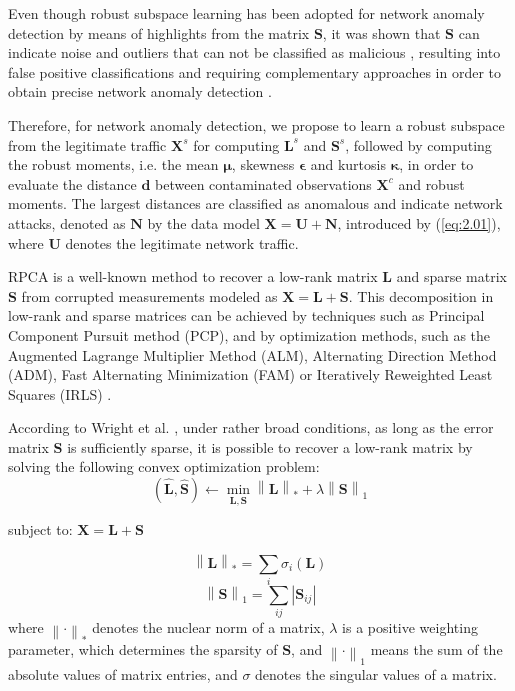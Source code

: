 Even though robust subspace learning has been adopted for network anomaly detection by means of highlights from the matrix $\pmb{S}$, it was shown that $\pmb{S}$ can indicate noise and outliers that can not be classified as malicious \cite{vaswani2018robust, lerman2018overview}, resulting into false positive classifications and requiring complementary approaches in order to obtain precise network anomaly detection \cite{zhou2017anomaly}.

Therefore, for network anomaly detection, we propose to learn a robust subspace from the legitimate traffic $\pmb{X}^s$ for computing $\pmb{L}^s$ and $\pmb{S}^s$, followed by computing the robust moments, i.e. the mean $\pmb{\mu}$, skewness $\pmb{\epsilon}$ and kurtosis $\pmb{\kappa}$, in order to evaluate the distance $\pmb{d}$ between contaminated observations $\pmb{X}^c$ and robust moments. The largest distances are classified as anomalous and indicate network attacks, denoted as $\pmb{N}$ by the data model $\pmb{X} = \pmb{U} + \pmb{N}$, introduced by (\ref{eq:2.01}), where $\pmb{U}$ denotes the legitimate network traffic.

RPCA is a well-known method to recover a low-rank matrix $\pmb{L}$ and sparse matrix $\pmb{S}$ from corrupted measurements modeled as $\pmb{X} = \pmb{L} + \pmb{S}$. This decomposition in low-rank and sparse matrices can be achieved by techniques such as Principal Component Pursuit method (PCP), and by optimization methods, such as the Augmented Lagrange Multiplier Method (ALM), Alternating Direction Method (ADM), Fast Alternating Minimization (FAM) or Iteratively Reweighted Least Squares (IRLS) \cite{candes2011robust,vaswani2018robust,lerman2018overview}.

According to Wright et al. \cite{wright2009robust}, under rather broad conditions, as long as the error matrix $\pmb{S}$ is sufficiently sparse, it is possible to recover a low-rank matrix by solving the following convex optimization problem:
\begin{equation}\label{eq:4.01}
	(\hat{\pmb{L}}, \hat{\pmb{S}})\leftarrow \min_{\pmb{L},\pmb{S}}\left \| \pmb{L} \right \|_{*} + \lambda \left \| \pmb{S} \right \|_{1}
\end{equation}
\begin{center} subject to: $\pmb{X} = \pmb{L} + \pmb{S}$ \end{center}
\begin{equation}\label{eq:4.02}
    \left \| \pmb{L} \right \|_{*} = \sum_{i} \sigma_{i}(\pmb{L})
\end{equation}
\begin{equation}\label{eq:4.03}
    \left \| \pmb{S} \right \|_{1} = \sum_{ij} \left | \pmb{S}_{ij} \right |
\end{equation}
where $\left\| \mathord{\cdot} \right\|_*$ denotes the nuclear norm of a matrix, $\lambda$ is a positive weighting parameter, which determines the sparsity of $\pmb{S}$, and $\left\| \mathord{\cdot} \right\|_1$ means the sum of the absolute values of matrix entries, and $\sigma$ denotes the singular values of a matrix. 


